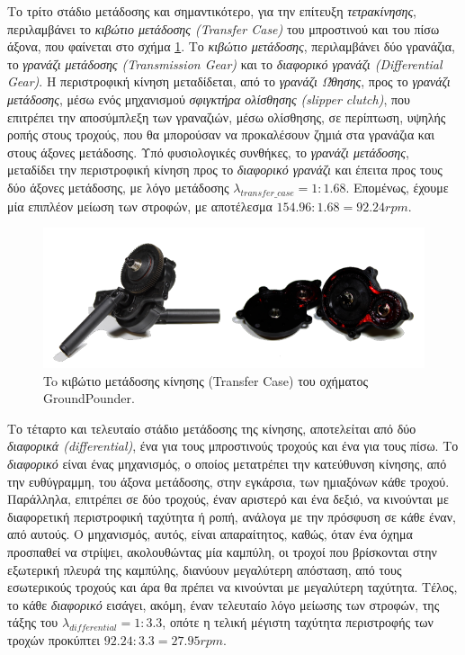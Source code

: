 \bigskip
Το τρίτο στάδιο μετάδοσης και σημαντικότερο, για την επίτευξη \textit{τετρακίνησης}, περιλαμβάνει το \textit{κιβώτιο μετάδοσης (Transfer Case)} του μπροστινού και του πίσω άξονα, που φαίνεται στο σχήμα \ref{fig:transfer_case}. Το \textit{κιβώτιο μετάδοσης}, περιλαμβάνει δύο γρανάζια, το \textit{γρανάζι μετάδοσης (Transmission Gear)} και το \textit{διαφορικό γρανάζι (Differential Gear)}. Η περιστροφική κίνηση μεταδίδεται, από το \textit{γρανάζι Ώθησης}, προς το \textit{γρανάζι μετάδοσης}, μέσω ενός μηχανισμού \textit{σφιγκτήρα ολίσθησης (slipper clutch)}, που επιτρέπει την αποσύμπλεξη των γραναζιών, μέσω ολίσθησης, σε περίπτωση, υψηλής ροπής στους τροχούς, που θα μπορούσαν να προκαλέσουν ζημιά στα γρανάζια και στους άξονες μετάδοσης. Υπό φυσιολογικές συνθήκες, το \textit{γρανάζι μετάδοσης}, μεταδίδει την περιστροφική κίνηση προς το \textit{διαφορικό γρανάζι} και έπειτα προς τους δύο άξονες μετάδοσης, με λόγο μετάδοσης $\lambda_{transfer\_case}=1:1.68$. Επομένως, έχουμε μία επιπλέον μείωση των στροφών, με αποτέλεσμα $154.96:1.68=92.24rpm$.

\begin{figure}[!ht]
	\centering
	\includegraphics[width=0.8\linewidth]{Chapters/Chapter2/Figures/transfer_case.png}
	\caption{To κιβώτιο μετάδοσης κίνησης (Transfer Case) του οχήματος GroundPounder.}
	\label{fig:transfer_case}
\end{figure}

\bigskip
Το τέταρτο και τελευταίο στάδιο μετάδοσης της κίνησης, αποτελείται από δύο \textit{διαφορικά (differential)}, ένα για τους μπροστινούς τροχούς και ένα για τους πίσω. Το \textit{διαφορικό} είναι ένας μηχανισμός, ο οποίος μετατρέπει την κατεύθυνση κίνησης, από την ευθύγραμμη, του άξονα μετάδοσης, στην εγκάρσια, των ημιαξόνων κάθε τροχού. Παράλληλα, επιτρέπει σε δύο τροχούς, έναν αριστερό και ένα δεξιό, να κινούνται με διαφορετική περιστροφική ταχύτητα ή ροπή, ανάλογα με την πρόσφυση σε κάθε έναν, από αυτούς. Ο μηχανισμός, αυτός, είναι απαραίτητος, καθώς, όταν ένα όχημα προσπαθεί να στρίψει, ακολουθώντας μία καμπύλη, οι τροχοί που βρίσκονται στην εξωτερική πλευρά της καμπύλης, διανύουν μεγαλύτερη απόσταση, από τους εσωτερικούς τροχούς και άρα θα πρέπει να κινούνται με μεγαλύτερη ταχύτητα. Τέλος, το κάθε \textit{διαφορικό} εισάγει, ακόμη, έναν τελευταίο λόγο μείωσης των στροφών, της τάξης του $\lambda_{differential}=1:3.3$, οπότε η τελική μέγιστη ταχύτητα περιστροφής των τροχών προκύπτει $92.24:3.3=27.95rpm$.

